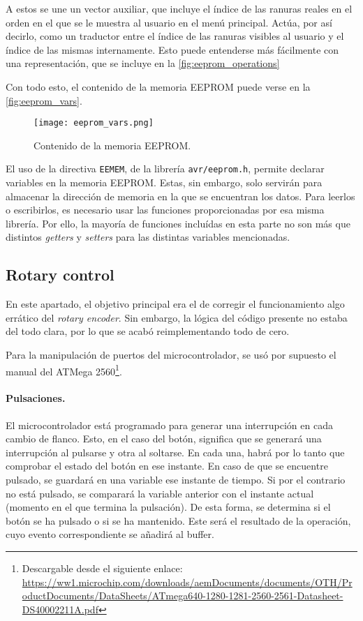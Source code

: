 A estos se une un vector auxiliar, que incluye el índice de las ranuras reales en el orden en el que se le muestra al usuario en el menú principal. Actúa, por así decirlo, como un traductor entre el índice de las ranuras visibles al usuario y el índice de las mismas internamente. Esto puede entenderse más fácilmente con una representación, que se incluye en la \autoref{fig:eeprom_operations}



Con todo esto, el contenido de la memoria EEPROM puede verse en la \autoref{fig:eeprom_vars}.

\begin{figure}
    \centering
    \texttt{[image: eeprom\_vars.png]}
    \caption{Contenido de la memoria EEPROM.}
    \label{fig:eeprom_vars}
\end{figure}

El uso de la directiva \verb|EEMEM|, de la librería \verb|avr/eeprom.h|, permite declarar variables en la memoria EEPROM. Estas, sin embargo, solo servirán para almacenar la dirección de memoria en la que se encuentran los datos. Para leerlos o escribirlos, es necesario usar las funciones proporcionadas por esa misma librería. Por ello, la mayoría de funciones incluídas en esta parte no son más que distintos \textit{getters} y \textit{setters} para las distintas variables mencionadas.

\subsection{Rotary control}

En este apartado, el objetivo principal era el de corregir el funcionamiento algo errático del \textit{rotary encoder}. Sin embargo, la lógica del código presente no estaba del todo clara, por lo que se acabó reimplementando todo de cero.

Para la manipulación de puertos del microcontrolador, se usó por supuesto el manual del ATMega 2560\footnote{Descargable desde el siguiente enlace: \url{https://ww1.microchip.com/downloads/aemDocuments/documents/OTH/ProductDocuments/DataSheets/ATmega640-1280-1281-2560-2561-Datasheet-DS40002211A.pdf}}.


\paragraph{Pulsaciones.} El microcontrolador está programado para generar una interrupción en cada cambio de flanco. Esto, en el caso del botón, significa que se generará una interrupción al pulsarse y otra al soltarse. En cada una, habrá por lo tanto que comprobar el estado del botón en ese instante. En caso de que se encuentre pulsado, se guardará en una variable ese instante de tiempo. Si por el contrario no está pulsado, se comparará la variable anterior con el instante actual (momento en el que termina la pulsación). De esta forma, se determina si el botón se ha pulsado o si se ha mantenido. Este será el resultado de la operación, cuyo evento correspondiente se añadirá al buffer.

